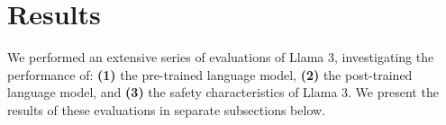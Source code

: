 \section{Results}
\label{section:results}

We performed an extensive series of evaluations of Llama 3, investigating the performance of: \textbf{(1)} the pre-trained language model, \textbf{(2)} the post-trained language model, and \textbf{(3)} the safety characteristics of Llama 3. We present the results of these evaluations in separate subsections below. 




